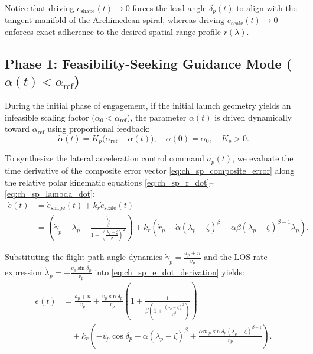 Notice that driving $e_{\text{shape}}(t) \to 0$ forces the lead angle $\delta_p(t)$ to align with the tangent manifold of the Archimedean spiral, whereas driving $e_{\text{scale}}(t) \to 0$ enforces exact adherence to the desired spatial range profile $r(\lambda)$.
\subsection{Phase 1: Feasibility-Seeking Guidance Mode ($\alpha(t) < \alpha_{\text{ref}}$)}\label{subsec:ch_sp_phase1}

During the initial phase of engagement, if the initial launch geometry yields an infeasible scaling factor ($\alpha_0 < \alpha_{\text{ref}}$), the parameter $\alpha(t)$ is driven dynamically toward $\alpha_{\text{ref}}$ using proportional feedback:
\begin{equation}\label{eq:ch_sp_alpha_dot_phase1}
	\dot{\alpha}(t) = K_p \big(\alpha_{\text{ref}} - \alpha(t)\big), \quad \alpha(0) = \alpha_0, \quad K_p > 0.
\end{equation}

To synthesize the lateral acceleration control command $a_p(t)$, we evaluate the time derivative of the composite error vector \eqref{eq:ch_sp_composite_error} along the relative polar kinematic equations \eqref{eq:ch_sp_r_dot}--\eqref{eq:ch_sp_lambda_dot}:
\begin{align}\label{eq:ch_sp_e_dot_derivation}
	\dot{e}(t) &= \dot{e}_{\text{shape}}(t) + k_r \dot{e}_{\text{scale}}(t) \nonumber \\
	&= \left( \dot{\gamma}_p - \dot{\lambda}_p - \frac{\frac{\dot{\lambda}_p}{\beta}}{1 + \left(\frac{\lambda_p - \zeta}{\beta}\right)^2} \right) + k_r \left( \dot{r}_p - \dot{\alpha}(\lambda_p - \zeta)^\beta - \alpha \beta (\lambda_p - \zeta)^{\beta-1} \dot{\lambda}_p \right).
\end{align}

Substituting the flight path angle dynamics $\dot{\gamma}_p = \frac{a_p + n}{v_p}$ and the LOS rate expression $\dot{\lambda}_p = -\frac{v_p \sin \delta_p}{r_p}$ into \eqref{eq:ch_sp_e_dot_derivation} yields:
\begin{align}\label{eq:ch_sp_e_dot_expanded}
	\dot{e}(t) &= \frac{a_p + n}{v_p} + \frac{v_p \sin \delta_p}{r_p} \left( 1 + \frac{1}{\beta \left( 1 + \frac{(\lambda_p - \zeta)^2}{\beta^2} \right)} \right) \nonumber \\
	&\quad + k_r \left( -v_p \cos \delta_p - \dot{\alpha}(\lambda_p - \zeta)^\beta + \frac{\alpha \beta v_p \sin \delta_p (\lambda_p - \zeta)^{\beta-1}}{r_p} \right).
\end{align}

